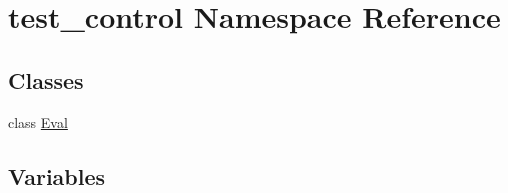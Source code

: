 \hypertarget{namespacetest__control}{}\section{test\+\_\+control Namespace Reference}
\label{namespacetest__control}
\subsection*{Classes}
\begin{DoxyCompactItemize}
\item 
class \hyperlink{classtest__control_1_1_eval}{Eval}
\end{DoxyCompactItemize}
\subsection*{Variables}
